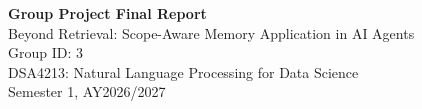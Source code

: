 \documentclass[11pt]{article}
\newcommand{\course}{DSA4213: Natural Language Processing for Data Science}
\newcommand{\semester}{Semester 1, AY2026/2027}
\begin{document}
\begin{center}
{\LARGE\bfseries Group Project Final Report}\\[0.4em]
{\large Beyond Retrieval: Scope-Aware Memory Application in AI Agents}\\[0.9em]
Group ID: 3\\[0.9em]
\course\\
\semester
\end{center}












\clearpage






\appendix

\end{document}

